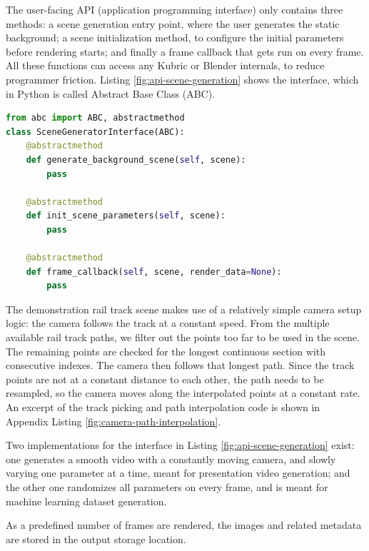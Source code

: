The user-facing API (application programming interface) only contains three methods: a scene generation entry point, where the user generates the static background; a scene initialization method, to configure the initial parameters before rendering starts; and finally a frame callback that gets run on every frame. All these functions can access any Kubric or Blender internals, to reduce programmer friction. Listing \ref{fig:api-scene-generation} shows the interface, which in Python is called Abstract Base Class (ABC).


\begin{lstlisting}[language=python,caption={Scene Generation API},label={fig:api-scene-generation}]
from abc import ABC, abstractmethod
class SceneGeneratorInterface(ABC):
    @abstractmethod
    def generate_background_scene(self, scene):
        pass
        
    @abstractmethod
    def init_scene_parameters(self, scene):
        pass
        
    @abstractmethod
    def frame_callback(self, scene, render_data=None):
        pass
\end{lstlisting}


The demonstration rail track scene makes use of a relatively simple camera setup logic: the camera follows the track at a constant speed. From the multiple available rail track paths, we filter out the points too far to be used in the scene. The remaining points are checked for the longest continuous section with consecutive indexes. The camera then follows that longest path. Since the track points are not at a constant distance to each other, the path needs to be resampled, so the camera moves along the interpolated points at a constant rate. An excerpt of the track picking and path interpolation code is shown in Appendix Listing \ref{fig:camera-path-interpolation}.

Two implementations for the interface in Listing \ref{fig:api-scene-generation} exist: one generates a smooth video with a constantly moving camera, and slowly varying  one parameter at a time, meant for presentation video generation; and the other one randomizes all parameters on every frame, and is meant for machine learning dataset generation.

As a predefined number of frames are rendered, the images and related metadata are stored in the output storage location.
